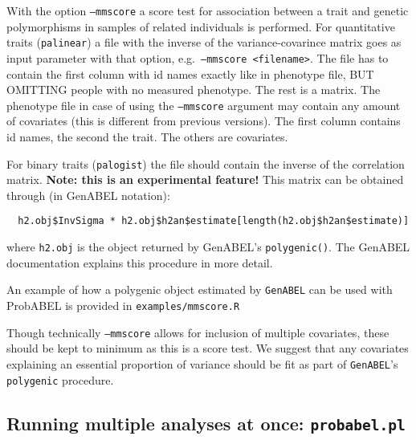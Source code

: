 \documentclass[12pt,a4paper]{article}
\newcommand{\PA}{\texttt{ProbABEL}}
\newcommand{\GA}{\texttt{GenABEL}}
\begin{document}
With the option \texttt{--mmscore} a score test for association
between a trait and genetic polymorphisms in samples of related
individuals is performed. For quantitative traits (\texttt{palinear})
a file with the inverse of the variance-covarince matrix goes as input
parameter with that option, e.g.~\texttt{--mmscore <filename>}. The
file has to contain the first column with id names exactly like in
phenotype file, BUT OMITTING people with no measured phenotype. The
rest is a matrix. The phenotype file in case of using the
\texttt{--mmscore} argument may contain any amount of covariates (this
is different from previous versions). The first column contains id
names, the second the trait. The others are covariates.

For binary traits (\texttt{palogist}) the file should contain the
inverse of the correlation matrix. \textbf{Note: this is an
  experimental feature!} This matrix can be obtained through (in
GenABEL notation):
\begin{verbatim}
  h2.obj$InvSigma * h2.obj$h2an$estimate[length(h2.obj$h2an$estimate)]
\end{verbatim}
where \texttt{h2.obj} is the object returned by GenABEL's
\texttt{polygenic()}. The GenABEL documentation explains this
procedure in more detail.

An example of how a polygenic object estimated by \GA{} can be used
with ProbABEL is provided in \texttt{examples/mmscore.R}

Though technically \texttt{--mmscore} allows for inclusion of multiple
covariates, these should be kept to minimum as this is a score test. We
suggest that any covariates explaining an essential proportion of
variance should be fit as part of \GA{}'s
\texttt{polygenic} procedure.


\subsection{Running multiple analyses at once: \texttt{probabel.pl}}
\end{document}
